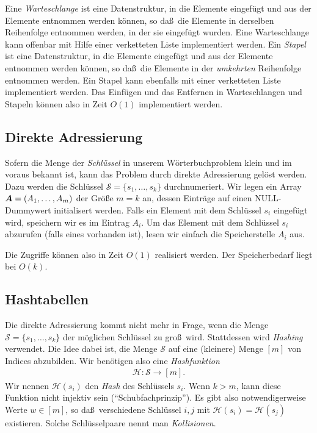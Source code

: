 \documentclass[10pt,reqno]{amsart}
\numberwithin{equation}{section}
\newcommand\cH{\mathcal H}
\newcommand\cS{\mathcal S}
\newcommand\vA{\vec A}
\def\vec#1{\mathchoice{\mbox{\boldmath$\displaystyle#1$}}
{\mbox{\boldmath$\textstyle#1$}}
{\mbox{\boldmath$\scriptstyle#1$}}
{\mbox{\boldmath$\scriptscriptstyle#1$}}}
\begin{document}
Eine {\em Warteschlange} ist eine Datenstruktur, in die Elemente eingef\"ugt und aus der Elemente entnommen werden k\"onnen, so da\ss\ die Elemente in derselben Reihenfolge entnommen werden, in der sie eingef\"ugt wurden.
Eine Warteschlange kann offenbar mit Hilfe einer verketteten Liste implementiert werden.
Ein {\em Stapel} ist eine Datenstruktur, in die Elemente eingef\"ugt und aus der Elemente entnommen werden k\"onnen, so da\ss\ die Elemente in der {\em umkehrten} Reihenfolge entnommen werden.
Ein Stapel kann ebenfalls mit einer verketteten Liste implementiert werden.
Das Einf\"ugen und das Entfernen in Warteschlangen und Stapeln k\"onnen also in Zeit $O(1)$ implementiert werden.

\subsection{Direkte Adressierung}\label{sec_direct}
Sofern die Menge der {\em Schl\"ussel} in unserem W\"orterbuchproblem klein und im voraus bekannt ist, kann das Problem durch direkte Adressierung gel\"ost werden.
Dazu werden die Schl\"ussel $\cS=\{s_1,\ldots,s_k\}$ durchnumeriert.
Wir legen ein Array $\vA=(A_1,\ldots,A_m)$ der Gr\"o\ss e $m=k$ an, dessen Eintr\"age auf einen NULL-Dummywert initialisert werden.
Falls ein Element mit dem Schl\"ussel $s_i$ eingef\"ugt wird, speichern wir es im Eintrag $A_i$.
Um das Element mit dem Schl\"ussel $s_i$ abzurufen (falls eines vorhanden ist), lesen wir einfach die Speicherstelle $A_i$ aus.

Die Zugriffe k\"onnen also in Zeit $O(1)$ realisiert werden.
Der Speicherbedarf liegt bei $O(k)$.

\subsection{Hashtabellen}\label{sec_hashtable}
Die direkte Adressierung kommt nicht mehr in Frage, wenn die Menge $\cS=\{s_1,\ldots,s_k\}$ der m\"oglichen Schl\"ussel zu gro\ss\ wird.
Stattdessen wird {\em Hashing} verwendet.
Die Idee dabei ist, die Menge $\cS$ auf eine (kleinere) Menge $[m]$ von Indices abzubilden.
Wir ben\"otigen also eine {\em Hashfunktion}
\begin{align*}
	\cH:\cS\to[m].
\end{align*}
Wir nennen $\cH(s_i)$ den {\em Hash} des Schl\"ussels $s_i$.
Wenn $k>m$, kann diese Funktion nicht injektiv sein (``Schubfachprinzip'').
Es gibt also notwendigerweise Werte $w\in[m]$, so da\ss\ verschiedene Schl\"ussel $i,j$ mit $\cH(s_i)=\cH(s_j)$ existieren.
Solche Schl\"usselpaare nennt man {\em Kollisionen}.
\end{document}
